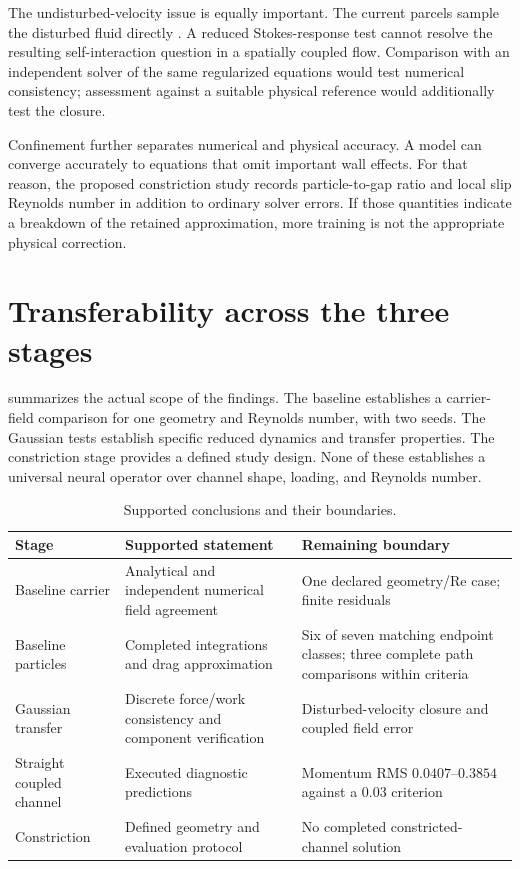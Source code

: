 The undisturbed-velocity issue is equally important. The current parcels
sample the disturbed fluid directly \citep{horwitz2016,ireland2017}. %
 A reduced Stokes-response test cannot
resolve the resulting self-interaction question in a spatially coupled
flow. Comparison with an independent solver of the same regularized
equations would test numerical consistency; assessment against a suitable
physical reference would additionally test the closure.

Confinement further separates numerical and physical accuracy. A model
can converge accurately to equations that omit important wall effects.
For that reason, the proposed constriction study records particle-to-gap
ratio and local slip Reynolds number in addition to ordinary solver errors.
If those quantities indicate a breakdown of the retained approximation,
more training is not the appropriate physical correction.

\section{Transferability across the three stages}
 summarizes the actual scope of the findings. The
baseline establishes a carrier-field comparison for one geometry and
Reynolds number, with two seeds. The Gaussian tests establish specific
reduced dynamics and transfer properties. The constriction stage provides
a defined study design. None of these establishes a universal neural
operator over channel shape, loading, and Reynolds number.

\begin{table}[htbp]\centering\small
\caption{Supported conclusions and their boundaries.}\label{tab:claim_scope}
\begin{tabularx}{\textwidth}{@{}p{}YY@{}}\toprule
Stage & Supported statement & Remaining boundary\\\midrule
Baseline carrier & Analytical and independent numerical field agreement & One declared geometry/Re case; finite residuals\\
Baseline particles & Completed integrations and drag approximation & Six of seven matching endpoint classes; three complete path comparisons within criteria\\
Gaussian transfer & Discrete force/work consistency and component verification & Disturbed-velocity closure and coupled field error\\
Straight coupled channel & Executed diagnostic predictions & Momentum RMS $0.0407$--$0.3854$ against a $0.03$ criterion\\
Constriction & Defined geometry and evaluation protocol & No completed constricted-channel solution\\
\bottomrule\end{tabularx}
\end{table}

